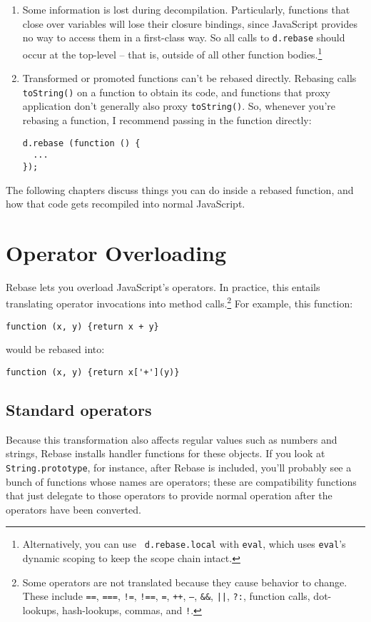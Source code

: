 \documentclass{report}
\begin{document}
\begin{enumerate}
\item Some information is lost during decompilation. Particularly, functions that close over variables will lose their closure bindings, since JavaScript provides no way to access them in a
        first-class way. So all calls to \verb|d.rebase| should occur at the top-level -- that is, outside of all other function bodies.\footnote{Alternatively, you can use {\tt
        d.rebase.local} with {\tt eval}, which uses {\tt eval}'s dynamic scoping to keep the scope chain intact.}

\item Transformed or promoted functions can't be rebased directly. Rebasing calls \verb|toString()| on a function to obtain its code, and functions that proxy application don't generally
        also proxy \verb|toString()|. So, whenever you're rebasing a function, I recommend passing in the function directly:

\begin{verbatim}
d.rebase (function () {
  ...
});
\end{verbatim}
\end{enumerate}

    The following chapters discuss things you can do inside a rebased function, and how that code gets recompiled into normal JavaScript.

\chapter {Operator Overloading}
    Rebase lets you overload JavaScript's operators. In practice, this entails translating operator invocations into method calls.\footnote{Some operators are not translated because they cause
    behavior to change. These include {\tt ==}, {\tt ===}, {\tt !=}, {\tt !==}, {\tt =}, {\tt ++}, {\tt --}, {\tt \&\&}, {\tt ||}, {\tt ?:}, function calls, dot-lookups, hash-lookups, commas,
    and {\tt !}.} For example, this function:

\begin{verbatim}
function (x, y) {return x + y}
\end{verbatim}

    \noindent would be rebased into:

\begin{verbatim}
function (x, y) {return x['+'](y)}
\end{verbatim}

\section {Standard operators}
      Because this transformation also affects regular values such as numbers and strings, Rebase installs handler functions for these objects. If you look at \verb|String.prototype|, for
      instance, after Rebase is included, you'll probably see a bunch of functions whose names are operators; these are compatibility functions that just delegate to those operators to provide
      normal operation after the operators have been converted.
\end{document}
